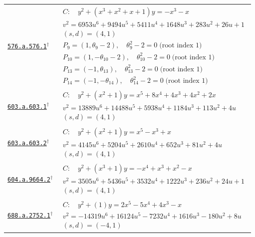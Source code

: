 \documentclass[10pt]{article}
\newcommand{\entryseparator}{\noalign{\vskip3pt\hbox to\linewidth{\leaders\hbox{\kern2pt\rule{3pt}{0.3pt}\kern2pt}\hfill}\nobreak\vskip3pt\nobreak}}
\begin{document}
\begin{landscape}
\begin{longtable}{@{}p{3.4cm}p{\dimexpr\linewidth-3.4cm-2\tabcolsep\relax}@{}}
\href{https://www.lmfdb.org/Genus2Curve/Q/576/a/576/1}{\texttt{576.a.576.1}}$^{\dagger}$ & $\begin{gathered}C:\quad y^2+\left(x^{3} + x^{2} + x + 1\right)y=-x^{3} - x\\v^2=6953 u^{6} + 9494 u^{5} + 5411 u^{4} + 1648 u^{3} + 283 u^{2} + 26 u + 1\\(s,d)=(4,1)\\P_{9}=\left(1,\theta_{9} - 2\right),\quad \theta_{9}^{2} - 2=0\;\text{(root index 1)}\\P_{10}=\left(1,-\theta_{10} - 2\right),\quad \theta_{10}^{2} - 2=0\;\text{(root index 1)}\\P_{13}=\left(-1,\theta_{13}\right),\quad \theta_{13}^{2} - 2=0\;\text{(root index 1)}\\P_{14}=\left(-1,-\theta_{14}\right),\quad \theta_{14}^{2} - 2=0\;\text{(root index 1)}\end{gathered}$ \\
\entryseparator
\href{https://www.lmfdb.org/Genus2Curve/Q/603/a/603/1}{\texttt{603.a.603.1}}$^{\dagger}$ & $\begin{gathered}C:\quad y^2+\left(x^{2} + 1\right)y=x^{5} + 8 x^{4} + 4 x^{3} + 4 x^{2} + 2 x\\v^2=13889 u^{6} + 14488 u^{5} + 5938 u^{4} + 1184 u^{3} + 113 u^{2} + 4 u\\(s,d)=(4,1)\end{gathered}$ \\
\entryseparator
\href{https://www.lmfdb.org/Genus2Curve/Q/603/a/603/2}{\texttt{603.a.603.2}}$^{\dagger}$ & $\begin{gathered}C:\quad y^2+\left(x^{2} + 1\right)y=x^{5} - x^{3} + x\\v^2=4145 u^{6} + 5204 u^{5} + 2610 u^{4} + 652 u^{3} + 81 u^{2} + 4 u\\(s,d)=(4,1)\end{gathered}$ \\
\entryseparator
\href{https://www.lmfdb.org/Genus2Curve/Q/604/a/9664/2}{\texttt{604.a.9664.2}}$^{\dagger}$ & $\begin{gathered}C:\quad y^2+\left(x^{3} + 1\right)y=-x^{4} + x^{3} + x^{2} - x\\v^2=3505 u^{6} + 5436 u^{5} + 3532 u^{4} + 1222 u^{3} + 236 u^{2} + 24 u + 1\\(s,d)=(4,1)\end{gathered}$ \\
\entryseparator
\href{https://www.lmfdb.org/Genus2Curve/Q/688/a/2752/1}{\texttt{688.a.2752.1}}$^{\dagger}$ & $\begin{gathered}C:\quad y^2+\left(1\right)y=2 x^{5} - 5 x^{4} + 4 x^{3} - x\\v^2=-14319 u^{6} + 16124 u^{5} - 7232 u^{4} + 1616 u^{3} - 180 u^{2} + 8 u\\(s,d)=(-4,1)\end{gathered}$ \\

\end{longtable}
\end{landscape}
\end{document}
